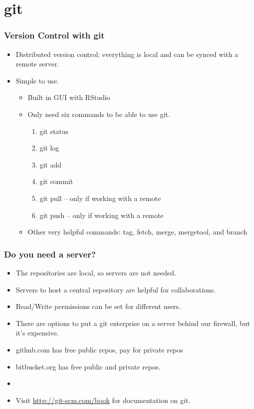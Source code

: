 \documentclass[t]{beamer}\usepackage[]{graphicx}\usepackage[]{color}
\begin{document}
\section{git}
\begin{frame}[fragile]
  \frametitle{Version Control with git}
  \begin{itemize}
    \item Distributed version control: everything is local and can be synced
      with a remote server.
    \item Simple to use.  
      \begin{itemize}
        \item Built in GUI with RStudio
        \item Only need six commands to be able to use git.
          \begin{enumerate}
            \item git status
            \item git log
            \item git add
            \item git commit
            \item git pull -- only if working with a remote
            \item git push -- only if working with a remote
          \end{enumerate}
        \item Other very helpful commands: tag, fetch, merge, mergetool, and
          branch
      \end{itemize}
  \end{itemize}
\end{frame}

\begin{frame}
  \frametitle{Do you need a server?}
  \begin{itemize}
    \item The repositories are local, so servers are not needed.
    \item Servers to host a central repository are helpful for collaborations.
    \item Read/Write permissions can be set for different users.
    \item There are options to put a git enterprise on a server behind our
      firewall, but it's expensive.
    \item github.com has free public repos, pay for private repos
    \item bitbucket.org has free public and private repos.
    \item[]
    \item Visit \url{http://git-scm.com/book} for documentation on git.
  \end{itemize}
\end{frame}


\end{document}
